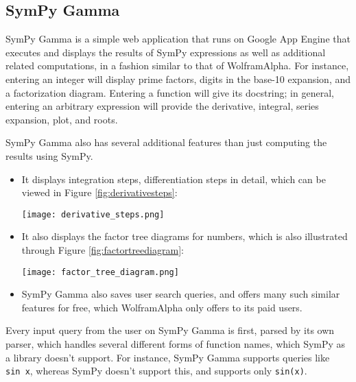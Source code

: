 \subsection{SymPy Gamma}\label{sympy-gamma}

SymPy Gamma is a simple web application that runs on Google App Engine 
that executes and displays the results of SymPy expressions as well as
additional related computations, in a fashion similar to that of
Wolfram\textbar{}Alpha. For instance, entering an integer will display
prime factors, digits in the base-10 expansion, and a factorization
diagram. Entering a function will give its docstring; in general,
entering an arbitrary expression will provide the derivative, integral,
series expansion, plot, and roots.

SymPy Gamma also has several additional features than just computing the
results using SymPy.

\begin{itemize}
\item
  It displays integration steps, differentiation steps in detail, which
  can be viewed in Figure \ref{fig:derivativesteps}:\par
\begin{minipage}{\textwidth}
    \centering
    \texttt{[image: derivative\_steps.png]}
    \label{fig:derivativesteps}
\end{minipage}
\item
  It also displays the factor tree diagrams for numbers, which is also
  illustrated through Figure \ref{fig:factortreediagram}:\par
\begin{minipage}{\textwidth}
    \centering
    \texttt{[image: factor\_tree\_diagram.png]}
    \label{fig:factortreediagram}
\end{minipage}
\item
  SymPy Gamma also saves user search queries, and offers many such 
  similar features for free, which Wolfram\textbar{}Alpha only offers 
  to its paid users.
\end{itemize}
Every input query from the user on SymPy Gamma is first, parsed by its
own parser, which handles several different forms of function names,
which SymPy as a library doesn't support. For instance, SymPy Gamma
supports queries like \texttt{sin\ x}, whereas SymPy doesn't support
this, and supports only \texttt{sin(x)}.

